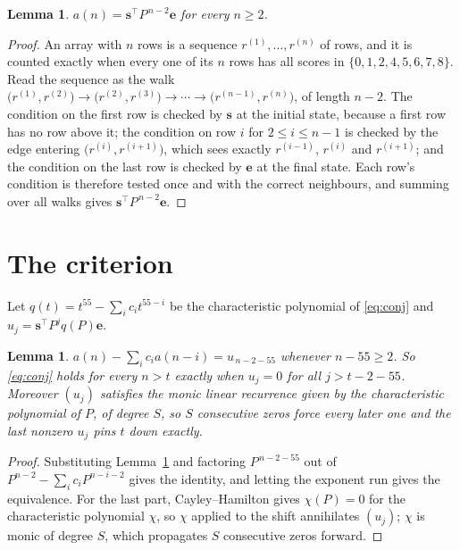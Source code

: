 \documentclass[11pt,a4paper]{article}
\theoremstyle{plain}
\newtheorem{lemma}[theorem]{Lemma}
\theoremstyle{definition}
\begin{document}
\begin{lemma}\label{lem:walk}
$a(n)=\mathbf{s}^{\!\top}P^{\,n-2}\mathbf{e}$ for every $n\ge2$.
\end{lemma}

\begin{proof}
An array with $n$ rows is a sequence $r^{(1)},\dots,r^{(n)}$ of rows, and it is counted
exactly when every one of its $n$ rows has all scores in $\{0,1,2,4,5,6,7,8\}$. Read the sequence as the
walk $\bigl(r^{(1)},r^{(2)}\bigr)\to\bigl(r^{(2)},r^{(3)}\bigr)\to\cdots\to
\bigl(r^{(n-1)},r^{(n)}\bigr)$, of length $n-2$. The condition on the first row is
checked by $\mathbf{s}$ at the initial state, because a first row has no row above it; the
condition on row $i$ for $2\le i\le n-1$ is checked by the edge entering
$\bigl(r^{(i)},r^{(i+1)}\bigr)$, which sees exactly $r^{(i-1)}$, $r^{(i)}$ and
$r^{(i+1)}$; and the condition on the last row is checked by $\mathbf{e}$ at the final
state. Each row's condition is therefore tested once and with the correct neighbours, and
summing over all walks gives $\mathbf{s}^{\!\top}P^{\,n-2}\mathbf{e}$.
\end{proof}

\section{The criterion}

Let $q(t)=t^{55}-\sum_i c_i t^{55-i}$ be the characteristic polynomial of
\eqref{eq:conj} and $u_j=\mathbf{s}^{\!\top}P^{j}q(P)\mathbf{e}$.

\begin{lemma}\label{lem:crit}
$a(n)-\sum_i c_i a(n-i)=u_{\,n-2-55}$ whenever $n-55\ge2$. So \eqref{eq:conj}
holds for every $n>t$ exactly when $u_j=0$ for all $j>t-2-55$. Moreover $(u_j)$
satisfies the monic linear recurrence given by the characteristic polynomial of $P$, of
degree $S$, so $S$ consecutive zeros force every later one and the last nonzero $u_j$ pins
$t$ down exactly.
\end{lemma}

\begin{proof}
Substituting Lemma~\ref{lem:walk} and factoring $P^{\,n-2-55}$ out of
$P^{n-2}-\sum_i c_i P^{n-i-2}$ gives the identity, and letting the exponent run gives the
equivalence. For the last part, Cayley--Hamilton gives $\chi(P)=0$ for the characteristic
polynomial $\chi$, so $\chi$ applied to the shift annihilates $(u_j)$; $\chi$ is monic of
degree $S$, which propagates $S$ consecutive zeros forward.
\end{proof}
\end{document}
